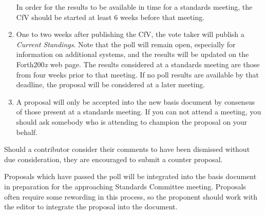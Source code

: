 \begin{enumerate}
	In order for the results to be available in time for a standards
	meeting, the CfV should be started at least 6 weeks before that
	meeting.


\item
	One to two weeks after publishing the CfV, the vote taker will
	publish a \emph{Current Standings}.  Note that the poll will remain
	open, especially for information on additional systems, and the
	results will be updated on the Forth200\emph{x} web page.  The
	results considered at a standards meeting are those from four weeks
	prior to that meeting.  If no poll results are available by that
	deadline, the proposal will be considered at a later meeting.

\item
	A proposal will only be accepted into the new basis document by
	consensus of those present at a standards meeting. If you can
	not attend a meeting, you should ask somebody who is attending
	to champion the proposal on your behalf.
\end{enumerate}

Should a contributor consider their comments to have been dismissed
without due consideration, they are encouraged to submit a counter
proposal.

Proposals which have passed the poll will be integrated into the basis
document in preparation for the approaching Standards Committee meeting.
Proposals often require some rewording in this process, so the proponent
should work with the editor to integrate the proposal into the document.




